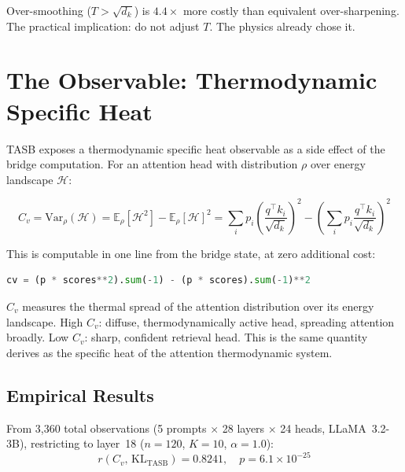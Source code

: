 \documentclass[11pt,a4paper]{article}
\begin{document}
Over-smoothing ($T > \sqrt{d_k}$) is $4.4\times$ more costly than equivalent
over-sharpening. The practical implication: do not adjust $T$. The physics
already chose it.

\section{The Observable: Thermodynamic Specific Heat}
\label{sec:observable}

TASB exposes a thermodynamic specific heat observable as a side effect of the
bridge computation. For an attention head with distribution $\rho$ over energy
landscape $\mathcal{H}$:

\begin{equation}
  C_v = \mathrm{Var}_\rho(\mathcal{H}) = \mathbb{E}_\rho[\mathcal{H}^2] - \mathbb{E}_\rho[\mathcal{H}]^2
  = \sum_i p_i \!\left(\frac{q^\top k_i}{\sqrt{d_k}}\right)^{\!2}
  - \left(\sum_i p_i \frac{q^\top k_i}{\sqrt{d_k}}\right)^{\!2}
  \label{eq:cv}
\end{equation}

This is computable in one line from the bridge state, at zero additional cost:

\begin{lstlisting}[language=Python, caption={Specific heat from bridge state.}]
cv = (p * scores**2).sum(-1) - (p * scores).sum(-1)**2
\end{lstlisting}

$C_v$ measures the thermal spread of the attention distribution over its energy
landscape. High $C_v$: diffuse, thermodynamically active head, spreading attention
broadly. Low $C_v$: sharp, confident retrieval head. This is the same quantity
\citet{kim2026thermodynamic} derives as the specific heat of the attention
thermodynamic system.

\subsection{Empirical Results}

From 3,360 total observations (5 prompts $\times$ 28 layers $\times$ 24 heads,
LLaMA~3.2-3B), restricting to layer~18 ($n=120$, $K=10$, $\alpha=1.0$):
\begin{equation}
  r(C_v,\, \mathrm{KL}_\mathrm{TASB}) = 0.8241,\quad p = 6.1 \times 10^{-25}
\end{equation}
\end{document}
